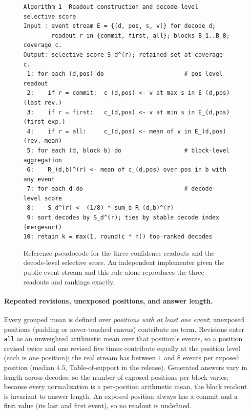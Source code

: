 \documentclass{article}
\begin{document}
\begin{figure}[ht]
\begin{minipage}{\linewidth}\small
\begin{verbatim}
Algorithm 1  Readout construction and decode-level selective score
Input : event stream E = {(d, pos, s, v)} for decode d;
        readout r in {commit, first, all}; blocks B_1..B_8; coverage c.
Output: selective score S_d^(r); retained set at coverage c.
 1: for each (d,pos) do                       # pos-level readout
 2:    if r = commit:  c_(d,pos) <- v at max s in E_(d,pos)  (last rev.)
 3:    if r = first:   c_(d,pos) <- v at min s in E_(d,pos)  (first exp.)
 4:    if r = all:     c_(d,pos) <- mean of v in E_(d,pos)  (rev. mean)
 5: for each (d, block b) do                  # block-level aggregation
 6:    R_(d,b)^(r) <- mean of c_(d,pos) over pos in b with any event
 7: for each d do                             # decode-level score
 8:    S_d^(r) <- (1/8) * sum_b R_(d,b)^(r)
 9: sort decodes by S_d^(r); ties by stable decode index (mergesort)
10: retain k = max(1, round(c * n)) top-ranked decodes
\end{verbatim}
\end{minipage}
\caption{Reference pseudocode for the three confidence readouts and the decode-level selective
score.  An independent implementer given the public event stream and this rule alone reproduces
the three readouts and rankings exactly.}
\label{fig:readout}
\end{figure}

\paragraph{Repeated revisions, unexposed positions, and answer length.}
Every grouped mean is defined over \emph{positions with at least one event}; unexposed
positions (padding or never-touched canvas) contribute no term.  Revisions enter \texttt{all}
as an unweighted arithmetic mean over that position's events, so a position revised twice and
one revised five times contribute equally at the position level (each is one position); the
real stream has between $1$ and $8$ events per exposed position (median $4.5$,
Table-of-support in the release).  Generated answers vary in length across decodes, so the
number of exposed positions per block varies; because every normalization is a per-position
arithmetic mean, the block readout is invariant to answer length.  An exposed position
always has a commit and a first value (its last and first event), so no readout is undefined.
\end{document}

